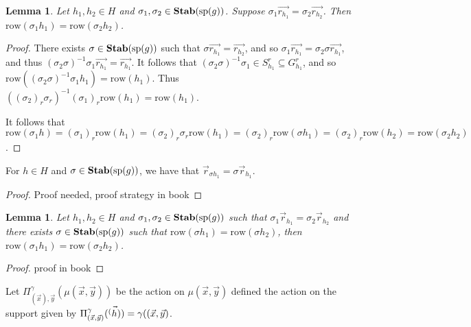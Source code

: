 \documentclass[12pt]{report}
\newtheorem{lem}[thm]{Lemma} \newtheorem{prop}[thm]{Proposition}
\newcommand{\stab}{\text{\textbf{Stab}}}
\newcommand{\consp}{\text{sp}}
\newcommand{\row}{\text{row}}
\newcommand{\spstab}[1]{\stab (\consp (#1))}
\begin{document}
\begin{lem}
  Let $h_1, h_2 \in H$ and $\sigma_1, \sigma_2 \in \spstab{g}$. Suppose
  $\sigma_1 \vec{r_{h_1}} = \sigma_2 \vec{r_{h_2}}$. Then $\row (\sigma_1 h_1) =
  \row (\sigma_2 h_2)$.
\end{lem}
\begin{proof}
  There exists $\sigma \in \spstab{g}$ such that $\sigma \vec{r_{h_1}} =
  \vec{r_{h_2}}$, and so $\sigma_1 \vec{r_{h_1}} = \sigma_2 \sigma
  \vec{r_{h_1}}$, and thus $(\sigma_2 \sigma)^{-1} \sigma_1 \vec{r_{h_1}} =
  \vec{r_{h_1}}$. It follows that $(\sigma_2 \sigma)^{-1} \sigma_1 \in S^r_{h_1}
  \subseteq G^r_{h_1}$, and so $\row ((\sigma_2 \sigma)^{-1} \sigma_1 h_1) =
  \row (h_1)$. Thus $((\sigma_2)_r \sigma_r)^{-1} (\sigma_1)_r \row (h_1) = \row
  (h_1)$.

  It follows that $\row (\sigma_1 h ) = (\sigma_1)_r \row (h_1) = (\sigma_2)_r
  \sigma_r\row (h_1) = (\sigma_2)_r \row (\sigma h_1) = (\sigma_2)_r \row (h_2)
  = \row (\sigma_2 h_2)$.

  
  
\end{proof}

\begin{claim}
  For $h \in H$ and $\sigma \in \stab(\consp (g))$, we have that
  $\vec{r}_{\sigma h_1} = \sigma \vec{r}_{h_1}$.
\end{claim}
\begin{proof}
  Proof needed, proof strategy in book
\end{proof}

\begin{lem}
  Let $h_1, h_2 \in H$ and $\sigma_1, \sigma_2 \in \stab (\consp(g))$ such that
  $\sigma_1 \vec{r}_{h_1} = \sigma_2 \vec{r}_{h_2}$ and there exists $\sigma \in
  \stab(\consp (g))$ such that $\row (\sigma h_1) = \row (\sigma h_2)$, then
  $\row (\sigma_1 h_1) = \row (\sigma_2 h_2)$.
\end{lem}
\begin{proof}
  proof in book
\end{proof}

Let $\Pi^\gamma_{(\vec{x}), \vec{y}}(\mu(\vec{x}, \vec{y}))$ be the action on
$\mu (\vec{x}, \vec{y})$ defined the action on the support given by
$\Pi^\gamma_{(\vec{x}, \vec{y})}(\vec{\sp(h)}) = \gamma ((\vec{x}, \vec{y})$.
\end{document}
